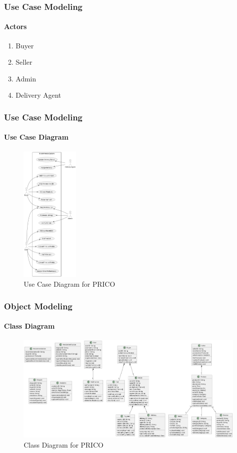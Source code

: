 \documentclass{beamer}
\begin{document}
\begin{frame}
	\frametitle{Use Case Modeling}
	\framesubtitle{Actors}
	\begin{enumerate}
		\item Buyer
		\item Seller
		\item Admin
		\item Delivery Agent
	\end{enumerate}
\end{frame}

\begin{frame}
	\frametitle{Use Case Modeling}
	\framesubtitle{Use Case Diagram}
	\begin{figure}
		\begin{center}
			\includegraphics[width=0.25\textwidth]{diagrams/use-case}
		\end{center}
		\caption{Use Case Diagram for PRICO}\label{fig:fig2}
	\end{figure}
\end{frame}

\begin{frame}
	\frametitle{Object Modeling}
	\framesubtitle{Class Diagram}
	\begin{figure}
		\begin{center}
			\includegraphics[width=1\textwidth]{diagrams/class}
		\end{center}
		\caption{Class Diagram for PRICO}\label{fig:fig3}
	\end{figure}
\end{frame}
\end{document}

